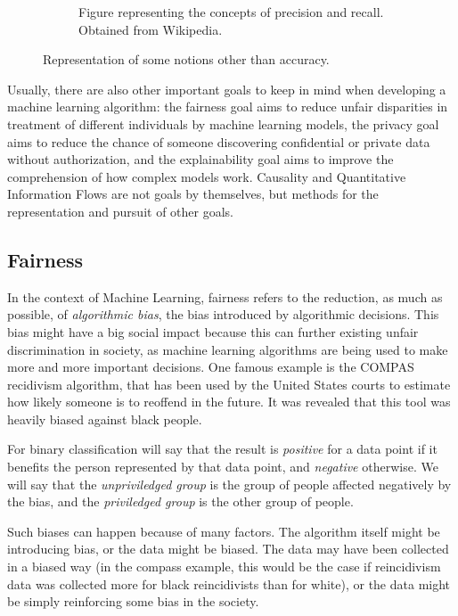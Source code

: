 \begin{figure}[ht]
\begin{subfigure}[b]{0.48\textwidth}
\caption{Figure representing the concepts of precision and recall. Obtained from Wikipedia.}\label{fig:PrecisionrecallWikipedia}
\end{subfigure}
\caption{Representation of some notions other than accuracy.}\label{fig:otherNotionsACC}
\end{figure}

Usually, there are also other important goals to keep in mind when developing a machine learning algorithm: the fairness goal aims to reduce unfair disparities in treatment of different individuals by machine learning models, the privacy goal aims to reduce the chance of someone discovering confidential or private data without authorization, and the explainability goal aims to improve the comprehension of how complex models work. Causality and Quantitative Information Flows are not goals by themselves, but methods for the representation and pursuit of other goals.

\subsection{Fairness}

In the context of Machine Learning, fairness refers to the reduction, as much as possible, of \emph{algorithmic bias}, the bias introduced by algorithmic decisions. This bias might have a big social impact because this can further existing unfair discrimination in society, as machine learning algorithms are being used to make more and more important decisions. One famous example is the COMPAS recidivism algorithm, that has been used by the United States courts to estimate how likely someone is to reoffend in the future. It was revealed \cite{Compass} that this tool was heavily biased against black people. 

For binary classification will say that the result is \emph{positive} for a data point if it benefits the person represented by that data point, and \emph{negative} otherwise. We will say that the \emph{unpriviledged group} is the group of people affected negatively by the bias, and the \emph{priviledged group} is the other group of people.

Such biases can happen because of many factors. The algorithm itself might be introducing bias, or the data might be biased. The data may have been collected in a biased way (in the compass example, this would be the case if reincidivism data was collected more for black reincidivists than for white), or the data might be simply reinforcing some bias in the society. 

